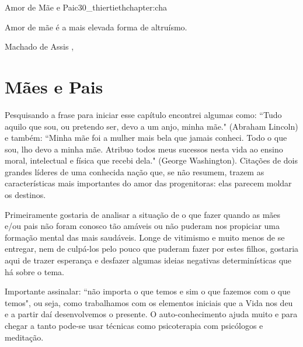 \begin{chapterpage}{Amor de Mãe e Pai}{c30_thiertiethchapter:cha}

\begin{myquotation}Amor de mãe é a mais elevada forma de altruísmo.

\par\vspace*{15mm}
\mbox{}\hfill \emdash{}Machado de Assis 
, %
\par\end{myquotation}

\end{chapterpage}



\section{Mães e Pais}\label{c1_basicformatting:sec}

\emdash{}Pesquisando a frase para iniciar esse capítulo encontrei algumas como: ``Tudo aquilo que sou, ou pretendo ser, devo a um anjo, minha mãe." (Abraham Lincoln) e também: ``Minha mãe foi a mulher mais bela que jamais conheci. Todo o que sou, lho devo a minha mãe. Atribuo todos meus sucessos nesta vida ao ensino moral, intelectual e física que recebi dela." (George Washington). Citações de dois grandes líderes de uma conhecida nação que, se não resumem, trazem as características mais importantes do amor das progenitoras: elas parecem moldar os destinos.

\emdash{}Primeiramente gostaria de analisar a situação de o que fazer quando as mães e/ou pais não foram conosco tão amáveis ou não puderam nos propiciar uma formação mental das mais saudáveis. Longe de vitimismo e muito menos de se entregar, nem de culpá-los pelo pouco que puderam fazer por estes filhos, gostaria aqui de trazer esperança e desfazer algumas ideias negativas determinísticas que há sobre o tema.

\emdash{}Importante assinalar: ``não importa o que temos e sim o que fazemos com o que temos", ou seja, como trabalhamos com os elementos iniciais que a Vida nos deu e a partir daí desenvolvemos o presente. O auto-conhecimento ajuda muito e para chegar a tanto pode-se usar técnicas como psicoterapia com psicólogos e meditação.

